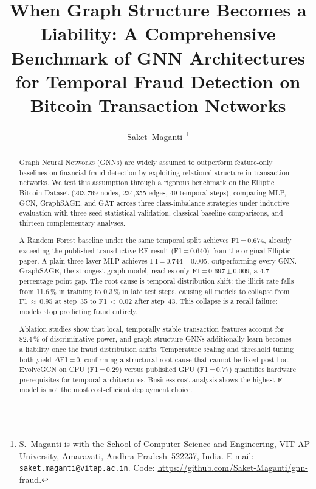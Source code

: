 \documentclass[journal,10pt,twoside]{IEEEtran}
\begin{document}
\title{When Graph Structure Becomes a Liability: A Comprehensive
Benchmark of GNN Architectures for Temporal Fraud Detection on
Bitcoin Transaction Networks}

\author{Saket~Maganti%
\thanks{S.~Maganti is with the School of Computer Science and
Engineering, VIT-AP University, Amaravati, Andhra Pradesh~522237,
India. E-mail: \texttt{saket.maganti@vitap.ac.in}.
Code: \url{https://github.com/Saket-Maganti/gnn-fraud}.}}


\maketitle

\begin{abstract}
Graph Neural Networks (GNNs) are widely assumed to outperform
feature-only baselines on financial fraud detection by exploiting
relational structure in transaction networks. We test this assumption
through a rigorous benchmark on the Elliptic Bitcoin Dataset (203,769
nodes, 234,355 edges, 49 temporal steps), comparing MLP, GCN,
GraphSAGE, and GAT across three class-imbalance strategies under
inductive evaluation with three-seed statistical validation, classical
baseline comparisons, and thirteen complementary analyses.

A Random Forest baseline under the same temporal split achieves
F1\,=\,0.674, already exceeding the published transductive RF result
(F1\,=\,0.640) from the original Elliptic paper. A plain three-layer
MLP achieves F1\,=\,0.744\,$\pm$\,0.005, outperforming every GNN.
GraphSAGE, the strongest graph model, reaches only
F1\,=\,0.697\,$\pm$\,0.009, a 4.7 percentage point gap. The root cause
is temporal distribution shift: the illicit rate falls from 11.6\,\%
in training to 0.3\,\% in late test steps, causing all models to
collapse from F1\,$\approx$\,0.95 at step~35 to F1\,$<$\,0.02 after
step~43. This collapse is a recall failure: models stop predicting
fraud entirely.

Ablation studies show that local, temporally stable transaction features
account for 82.4\,\% of discriminative power, and graph structure
GNNs additionally learn becomes a liability once the fraud distribution
shifts. Temperature scaling and threshold tuning both yield
$\Delta$F1\,=\,0, confirming a structural root cause that cannot be
fixed post hoc. EvolveGCN on CPU (F1\,=\,0.29) versus published GPU
(F1\,=\,0.77) quantifies hardware prerequisites for temporal
architectures. Business cost analysis shows the highest-F1 model is
not the most cost-efficient deployment choice.
\end{abstract}
\end{document}
